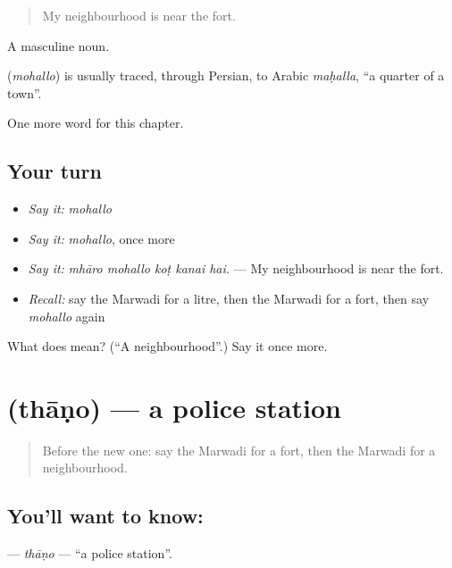 \begin{quote}
My neighbourhood is near the fort.
\end{quote}

A masculine noun.

\begin{cousinweb}
\textbf{} (\emph{mohallo}) is usually traced, through Persian, to Arabic \emph{maḥalla}, \textquotedblleft{}a quarter of a town\textquotedblright{}.
\end{cousinweb}

\begin{grammarlens}[title={What you've built}]
One more word for this chapter.
\end{grammarlens}

\subsection*{Your turn}
\begin{itemize}
\raggedright
  \item \emph{Say it:} \emph{mohallo}
  \item \emph{Say it:} \emph{mohallo}, once more
  \item \emph{Say it:} \emph{mhāro mohallo koṭ kanai hai.} — My neighbourhood is near the fort.
  \item \emph{Recall:} say the Marwadi for a litre, then the Marwadi for a fort, then say \emph{mohallo} again
\end{itemize}

\begin{tcolorbox}[breakable,colback=teal!4,colframe=teal!35!black,title={Before you move on}]
What does  mean? (\textquotedblleft{}A neighbourhood\textquotedblright{}.) Say it once more.
\end{tcolorbox}
\section[\texorpdfstring{\mw{थाणो} (thāṇo)}{थाणो (thāṇo)}]{ (thāṇo) — a police station}

\label{lesson:MW-C201-thano}



\begin{quote}
Before the new one: say the Marwadi for a fort, then the Marwadi for a neighbourhood.
\end{quote}

\subsection*{You'll want to know: }
\textbf{} — \emph{thāṇo} — \textquotedblleft{}a police station\textquotedblright{}.

